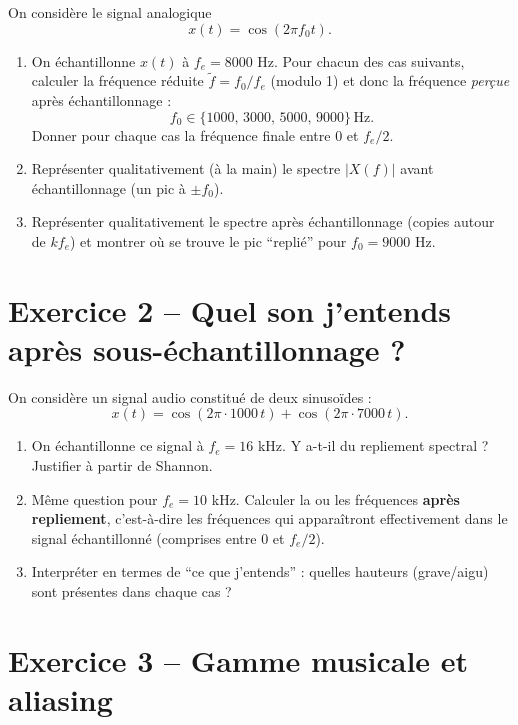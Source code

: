 On considère le signal analogique 
\[
x(t) = \cos(2\pi f_0 t).
\]

\begin{enumerate}[label=(\alph*)]
    \item On échantillonne $x(t)$ à $f_e = 8000$ Hz.  
    Pour chacun des cas suivants, calculer la fréquence réduite $\tilde f = f_0/f_e$ (modulo 1) et donc la fréquence \emph{perçue} après échantillonnage :
    \[
    f_0 \in \{1000,\, 3000,\, 5000,\, 9000\}\,\text{Hz}.
    \]
    Donner pour chaque cas la fréquence finale entre $0$ et $f_e/2$.

    \item Représenter qualitativement (à la main) le spectre $|X(f)|$ avant échantillonnage (un pic à $\pm f_0$).  

    \item Représenter qualitativement le spectre après échantillonnage (copies autour de $k f_e$) et montrer où se trouve le pic “replié” pour $f_0=9000$ Hz.
\end{enumerate}

\section*{Exercice 2 – Quel son j’entends après sous-échantillonnage ?}

On considère un signal audio constitué de deux sinusoïdes :
\[
x(t) = \cos(2\pi \cdot 1000\, t) + \cos(2\pi \cdot 7000\, t).
\]

\begin{enumerate}[label=(\alph*)]
    \item On échantillonne ce signal à $f_e = 16$ kHz.  
    Y a-t-il du repliement spectral ? Justifier à partir de Shannon.

    \item Même question pour $f_e = 10$ kHz.  
    Calculer la ou les fréquences \textbf{après repliement}, c’est-à-dire les fréquences qui apparaîtront effectivement dans le signal échantillonné (comprises entre $0$ et $f_e/2$).

    \item Interpréter en termes de “ce que j’entends” : quelles hauteurs (grave/aigu) sont présentes dans chaque cas ?
\end{enumerate}

\section*{Exercice 3 – Gamme musicale et aliasing}

